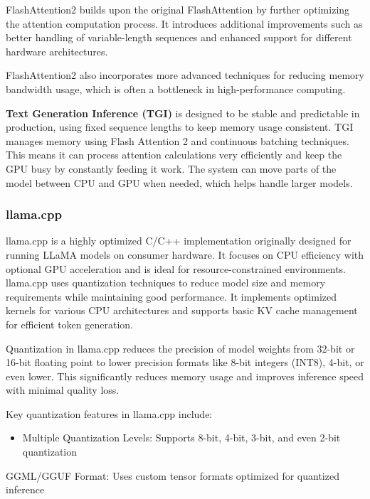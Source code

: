 \documentclass{article}
\begin{document}
FlashAttention2 builds upon the original FlashAttention by further optimizing the attention computation process. It introduces additional improvements such as better handling of variable-length sequences and enhanced support for different hardware architectures.

FlashAttention2 also incorporates more advanced techniques for reducing memory bandwidth usage, which is often a bottleneck in high-performance computing.

\textbf{Text Generation Inference (TGI)} is designed to be stable and
predictable in production, using fixed sequence lengths to keep memory
usage consistent. TGI manages memory using Flash Attention 2 and
continuous batching techniques. This means it can process attention
calculations very efficiently and keep the GPU busy by constantly
feeding it work. The system can move parts of the model between CPU and
GPU when needed, which helps handle larger models.

\subsubsection{llama.cpp}\label{llama.cpp}

llama.cpp is a highly optimized C/C++ implementation originally designed
for running LLaMA models on consumer hardware. It focuses on CPU
efficiency with optional GPU acceleration and is ideal for
resource-constrained environments. llama.cpp uses quantization
techniques to reduce model size and memory requirements while
maintaining good performance. It implements optimized kernels for
various CPU architectures and supports basic KV cache management for
efficient token generation.

Quantization in llama.cpp reduces the precision of model weights from
32-bit or 16-bit floating point to lower precision formats like 8-bit
integers (INT8), 4-bit, or even lower. This significantly reduces memory
usage and improves inference speed with minimal quality loss.

Key quantization features in llama.cpp include:

\begin{itemize}
\item
  Multiple Quantization Levels: Supports 8-bit, 4-bit, 3-bit, and even
  2-bit quantization
\end{itemize}

GGML/GGUF Format: Uses custom tensor formats optimized for quantized
inference
\end{document}
